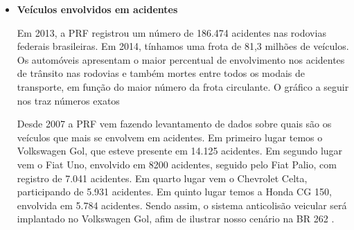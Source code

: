 \begin{itemize}
\item \textbf{Veículos envolvidos em acidentes}

Em 2013, a PRF registrou um número de 186.474 acidentes nas rodovias federais brasileiras. Em 2014, tínhamos uma frota de 81,3 milhões de veículos.
Os automóveis apresentam o maior percentual de envolvimento nos acidentes de trânsito nas rodovias e também mortes entre todos os modais de transporte, em função do maior número da frota circulante. O gráfico a seguir nos traz números exatos

Desde 2007 a PRF vem fazendo levantamento de dados sobre quais são os veículos que mais se envolvem em acidentes. Em primeiro lugar temos o Volkswagen Gol, que esteve presente em 14.125 acidentes. Em segundo lugar vem o Fiat Uno, envolvido em 8200 acidentes, seguido pelo Fiat Palio, com registro de 7.041 acidentes. Em quarto lugar vem o Chevrolet Celta, participando de 5.931 acidentes. Em quinto lugar temos a Honda CG 150, envolvida em 5.784 acidentes.
Sendo assim, o sistema anticolisão veicular será implantado no Volkswagen Gol, afim de ilustrar nosso cenário na BR 262 \cite{terra}.

\end{itemize}
